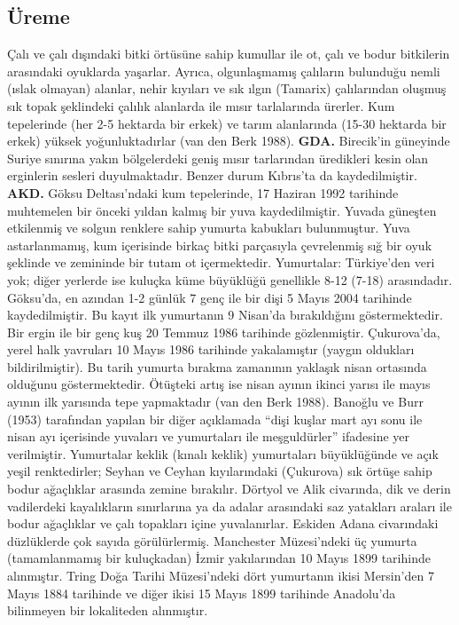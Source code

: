 \documentclass[
  letterpaper,
  DIV=11,
  numbers=noendperiod]{scrreprt}
\begin{document}
\hypertarget{uxfcreme-40}{%
\subsection{\texorpdfstring{\textbf{Üreme}}{Üreme}}\label{uxfcreme-40}}

Çalı ve çalı dışındaki bitki örtüsüne sahip kumullar ile ot, çalı ve
bodur bitkilerin arasındaki oyuklarda yaşarlar. Ayrıca, olgunlaşmamış
çalıların bulunduğu nemli (ıslak olmayan) alanlar, nehir kıyıları ve sık
ılgın (Tamarix) çalılarından oluşmuş sık topak şeklindeki çalılık
alanlarda ile mısır tarlalarında ürerler. Kum tepelerinde (her 2-5
hektarda bir erkek) ve tarım alanlarında (15-30 hektarda bir erkek)
yüksek yoğunluktadırlar (van den Berk 1988). \textbf{GDA.} Birecik'in
güneyinde Suriye sınırına yakın bölgelerdeki geniş mısır tarlarından
üredikleri kesin olan erginlerin sesleri duyulmaktadır. Benzer durum
Kıbrıs'ta da kaydedilmiştir. \textbf{AKD.} Göksu Deltası'ndaki kum
tepelerinde, 17 Haziran 1992 tarihinde muhtemelen bir önceki yıldan
kalmış bir yuva kaydedilmiştir. Yuvada güneşten etkilenmiş ve solgun
renklere sahip yumurta kabukları bulunmuştur. Yuva astarlanmamış, kum
içerisinde birkaç bitki parçasıyla çevrelenmiş sığ bir oyuk şeklinde ve
zemininde bir tutam ot içermektedir. Yumurtalar: Türkiye'den veri yok;
diğer yerlerde ise kuluçka küme büyüklüğü genellikle 8-12 (7-18)
arasındadır. Göksu'da, en azından 1-2 günlük 7 genç ile bir dişi 5 Mayıs
2004 tarihinde kaydedilmiştir. Bu kayıt ilk yumurtanın 9 Nisan'da
bırakıldığını göstermektedir. Bir ergin ile bir genç kuş 20 Temmuz 1986
tarihinde gözlenmiştir. Çukurova'da, yerel halk yavruları 10 Mayıs 1986
tarihinde yakalamıştır (yaygın oldukları bildirilmiştir). Bu tarih
yumurta bırakma zamanının yaklaşık nisan ortasında olduğunu
göstermektedir. Ötüşteki artış ise nisan ayının ikinci yarısı ile mayıs
ayının ilk yarısında tepe yapmaktadır (van den Berk 1988). Banoğlu ve
Burr (1953) tarafından yapılan bir diğer açıklamada ``dişi kuşlar mart
ayı sonu ile nisan ayı içerisinde yuvaları ve yumurtaları ile
meşguldürler'' ifadesine yer verilmiştir. Yumurtalar keklik (kınalı
keklik) yumurtaları büyüklüğünde ve açık yeşil renktedirler; Seyhan ve
Ceyhan kıyılarındaki (Çukurova) sık örtüşe sahip bodur ağaçlıklar
arasında zemine bırakılır. Dörtyol ve Alik civarında, dik ve derin
vadilerdeki kayalıkların sınırlarına ya da adalar arasındaki saz
yatakları araları ile bodur ağaçlıklar ve çalı topakları içine
yuvalanırlar. Eskiden Adana civarındaki düzlüklerde çok sayıda
görülürlermiş. Manchester Müzesi'ndeki üç yumurta (tamamlanmamış bir
kuluçkadan) İzmir yakılarından 10 Mayıs 1899 tarihinde alınmıştır. Tring
Doğa Tarihi Müzesi'ndeki dört yumurtanın ikisi Mersin'den 7 Mayıs 1884
tarihinde ve diğer ikisi 15 Mayıs 1899 tarihinde Anadolu'da bilinmeyen
bir lokaliteden alınmıştır.
\end{document}
